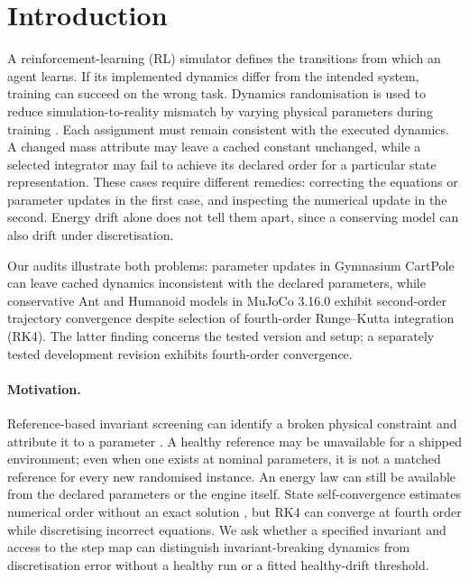 \documentclass[10pt]{article}
\theoremstyle{definition}
\begin{document}
\section{Introduction}

A reinforcement-learning (RL) simulator defines the transitions from which an
agent learns. If its implemented dynamics differ from the intended system,
training can succeed on the wrong task. Dynamics randomisation is used to
reduce simulation-to-reality mismatch by varying physical parameters during
training \citep{peng2018}. Each assignment must remain consistent with the
executed dynamics. A changed mass attribute may leave a cached constant
unchanged, while a selected integrator may fail to achieve its declared order
for a particular state representation. These cases require different remedies:
correcting the equations or parameter updates in the first case, and
inspecting the numerical update in the second. Energy drift alone does not
tell them apart, since a conserving model can also drift under discretisation.

Our audits illustrate both problems: parameter updates in Gymnasium CartPole
can leave cached dynamics inconsistent with the declared parameters, while
conservative Ant and Humanoid models in MuJoCo 3.16.0 exhibit second-order
trajectory convergence despite selection of fourth-order Runge--Kutta
integration (RK4). The latter finding concerns the tested version and setup;
a separately tested development revision exhibits fourth-order convergence.

\paragraph{Motivation.}
Reference-based invariant screening can identify a broken physical constraint
and attribute it to a parameter \citep{gebrekidan2026diagnosing}.
A healthy reference may be unavailable for a shipped environment; even when one
exists at nominal parameters, it is not a matched reference for every new
randomised instance. An energy law can still be available from the declared
parameters or the engine itself. State self-convergence estimates numerical
order without an exact solution \citep{roache1998,nparcconvergence}, but RK4
can converge at fourth order while discretising incorrect equations. We ask
whether a specified invariant and access to the step map can distinguish
invariant-breaking dynamics from discretisation error without a healthy run
or a fitted healthy-drift threshold.
\end{document}
